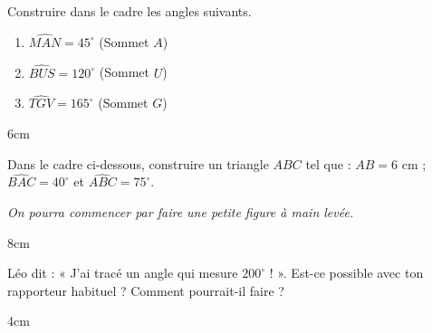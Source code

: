 \documentclass[a4paper]{book}
\begin{document}
    \begin{exercice}
        Construire dans le cadre les angles suivants.
        \begin{enumerate}
            \item $\widehat{MAN} = 45^\circ$ (Sommet $A$)
            \item $\widehat{BUS} = 120^\circ$ (Sommet $U$)
            \item $\widehat{TGV} = 165^\circ$ (Sommet $G$)
        \end{enumerate}
        
        \begin{ZoneReponse}{6cm}
        \end{ZoneReponse}
    \end{exercice}
    
    
    \begin{exercice}
        Dans le cadre ci-dessous, construire un triangle $ABC$ tel que :
        $AB = 6$ cm ; $\widehat{BAC} = 40^\circ$ et $\widehat{ABC} = 75^\circ$.
        
        \textit{On pourra commencer par faire une petite figure à main levée.}
        
        \begin{ZoneReponse}{8cm}
        \end{ZoneReponse}
    \end{exercice}
    
    \begin{exercice}[Le Défi]
        Léo dit : « J'ai tracé un angle qui mesure $200^\circ$ ! ». 
        Est-ce possible avec ton rapporteur habituel ? Comment pourrait-il faire ?
        
        \begin{ZoneReponse}{4cm}
        \end{ZoneReponse}
    \end{exercice}
\end{document}

